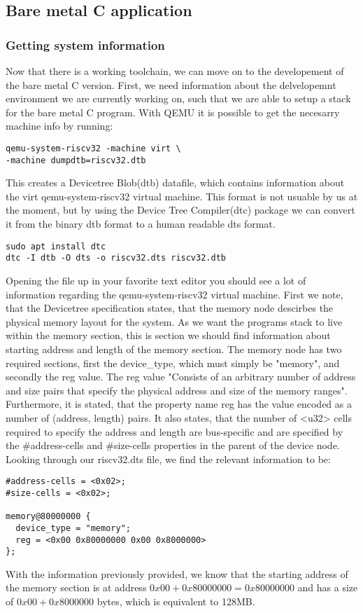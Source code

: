 \subsection{Bare metal C application}
\subsubsection{Getting system information}
Now that there is a working toolchain, we can move on to the developement of the
bare metal C version. First, we need information about the delvelopemnt
environment we are currently working on, such that we are able to setup a stack
for the bare metal C program. With QEMU it is possible to get the necesarry
machine info by running:
\begin{lstlisting}
qemu-system-riscv32 -machine virt \
-machine dumpdtb=riscv32.dtb
\end{lstlisting}
This creates a Devicetree Blob(dtb) datafile, which contains information about
the virt qemu-system-riscv32 virtual machine. This format is not usuable by us
at the moment, but by using the Device Tree Compiler(dtc) package we can convert
it from the binary dtb format to a human readable dts format.
\begin{lstlisting}
sudo apt install dtc
dtc -I dtb -O dts -o riscv32.dts riscv32.dtb
\end{lstlisting}
Opening the file up in your favorite text editor you should see a lot of
information regarding the qemu-system-riscv32 virtual machine. First we note,
that the Devicetree specification states, that the memory node descirbes the
physical memory layout for the system. As we want the programs stack
to live within the memory section, this is section we should find information
about starting address and length of the memory section. The memory node has
two required sections, first the device\_type, which must simply be "memory", and
secondly the reg value. The reg value "Consists of an arbitrary number of
address and size pairs that specify the physical address and size of the memory
ranges". \cite{DTS} Furthermore, it is stated, that the property name reg has
the value encoded as a number of (address, length) pairs. It also states, that
the number of <u32> cells required to specify the address and length are
bus-specific and are specified by the \#address-cells and \#size-cells properties
in the parent of the device node.
Looking through our riscv32.dts file, we find the relevant information to be:
\begin{lstlisting}
#address-cells = <0x02>;
#size-cells = <0x02>;

memory@80000000 {
  device_type = "memory";
  reg = <0x00 0x80000000 0x00 0x8000000>
};
\end{lstlisting}
With the information previously provided, we know that the starting
address of the memory section is at address $0x00 + 0x80000000 = 0x80000000$ and has a size of
$0x00 + 0x8000000$ bytes, which is equivalent to 128MB.


